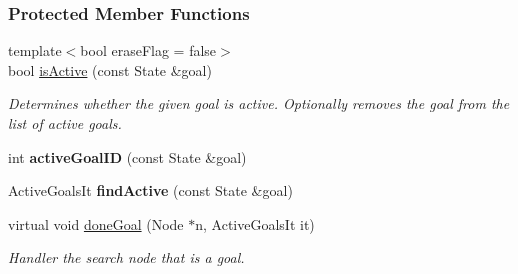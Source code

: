 \subsubsection*{Protected Member Functions}
\begin{DoxyCompactItemize}
\item 
{\footnotesize template$<$bool erase\+Flag = false$>$ }\\bool \hyperlink{structslb_1_1ext_1_1policy_1_1goalHandler_1_1MultipleGoal_acdb94b8e9f035fbdb3ea45188964abfa}{is\+Active} (const State \&goal)
\begin{DoxyCompactList}\small\item\em Determines whether the given goal is active. Optionally removes the goal from the list of active goals. \end{DoxyCompactList}\item 
int {\bfseries active\+Goal\+ID} (const State \&goal)\hypertarget{structslb_1_1ext_1_1policy_1_1goalHandler_1_1MultipleGoal_ac6197e621b246d5347155a3f226da9f1}{}\label{structslb_1_1ext_1_1policy_1_1goalHandler_1_1MultipleGoal_ac6197e621b246d5347155a3f226da9f1}

\item 
Active\+Goals\+It {\bfseries find\+Active} (const State \&goal)\hypertarget{structslb_1_1ext_1_1policy_1_1goalHandler_1_1MultipleGoal_ab8b2e36fc96d3162476cab3c8c75aa05}{}\label{structslb_1_1ext_1_1policy_1_1goalHandler_1_1MultipleGoal_ab8b2e36fc96d3162476cab3c8c75aa05}

\item 
virtual void \hyperlink{structslb_1_1ext_1_1policy_1_1goalHandler_1_1MultipleGoal_a49b937b31fcf0ecb22d71f75d12e0a7c}{done\+Goal} (Node $\ast$n, Active\+Goals\+It it)
\begin{DoxyCompactList}\small\item\em Handler the search node that is a goal. \end{DoxyCompactList}\end{DoxyCompactItemize}
